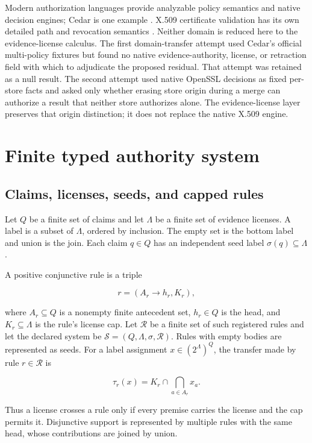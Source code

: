 \documentclass[pdflatex,sn-mathphys-num]{sn-jnl}
\begin{document}
Modern authorization languages provide analyzable policy semantics and native decision engines; Cedar is one example \citep{cutler2024}. X.509 certificate validation has its own detailed path and revocation semantics \citep{rfc5280}. Neither domain is reduced here to the evidence-license calculus. The first domain-transfer attempt used Cedar's official multi-policy fixtures but found no native evidence-authority, license, or retraction field with which to adjudicate the proposed residual. That attempt was retained as a null result. The second attempt used native OpenSSL decisions as fixed per-store facts and asked only whether erasing store origin during a merge can authorize a result that neither store authorizes alone. The evidence-license layer preserves that origin distinction; it does not replace the native X.509 engine.

\section{Finite typed authority system}\label{finite-typed-authority-system}

\subsection{Claims, licenses, seeds, and capped rules}\label{claims-licenses-seeds-and-capped-rules}

Let \(Q\) be a finite set of claims and let \(\Lambda\) be a finite set of evidence licenses. A label is a subset of \(\Lambda\), ordered by inclusion. The empty set is the bottom label and union is the join. Each claim \(q\in Q\) has an independent seed label \(\sigma(q)\subseteq\Lambda\).

A positive conjunctive rule is a triple

\[
r=(A_r\rightarrow h_r, K_r),
\]

where \(A_r\subseteq Q\) is a nonempty finite antecedent set, \(h_r\in Q\) is the head, and \(K_r\subseteq\Lambda\) is the rule's license cap. Let \(\mathcal{R}\) be a finite set of such registered rules and let the declared system be \(\mathcal{S}=(Q,\Lambda,\sigma,\mathcal{R})\). Rules with empty bodies are represented as seeds. For a label assignment \(x\in(2^\Lambda)^Q\), the transfer made by rule \(r\in\mathcal{R}\) is

\[
\tau_r(x)=K_r\cap\bigcap_{a\in A_r}x_a.
\]

Thus a license crosses a rule only if every premise carries the license and the cap permits it. Disjunctive support is represented by multiple rules with the same head, whose contributions are joined by union.
\end{document}

